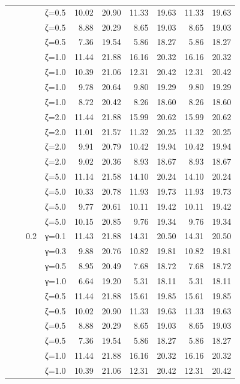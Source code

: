 \begin{table}[htbp]
\begin{tabular}{ll r l  rr  rr  rr}
  &  &  & ζ=0.5 & 10.02 & 20.90 & 11.33 & 19.63 & 11.33 & 19.63 \\
  &  &  & ζ=0.5 & 8.88 & 20.29 & 8.65 & 19.03 & 8.65 & 19.03 \\
  &  &  & ζ=0.5 & 7.36 & 19.54 & 5.86 & 18.27 & 5.86 & 18.27 \\
  &  &  & ζ=1.0 & 11.44 & 21.88 & 16.16 & 20.32 & 16.16 & 20.32 \\
  &  &  & ζ=1.0 & 10.39 & 21.06 & 12.31 & 20.42 & 12.31 & 20.42 \\
  &  &  & ζ=1.0 & 9.78 & 20.64 & 9.80 & 19.29 & 9.80 & 19.29 \\
  &  &  & ζ=1.0 & 8.72 & 20.42 & 8.26 & 18.60 & 8.26 & 18.60 \\
  &  &  & ζ=2.0 & 11.44 & 21.88 & 15.99 & 20.62 & 15.99 & 20.62 \\
  &  &  & ζ=2.0 & 11.01 & 21.57 & 11.32 & 20.25 & 11.32 & 20.25 \\
  &  &  & ζ=2.0 & 9.91 & 20.79 & 10.42 & 19.94 & 10.42 & 19.94 \\
  &  &  & ζ=2.0 & 9.02 & 20.36 & 8.93 & 18.67 & 8.93 & 18.67 \\
  &  &  & ζ=5.0 & 11.14 & 21.58 & 14.10 & 20.24 & 14.10 & 20.24 \\
  &  &  & ζ=5.0 & 10.33 & 20.78 & 11.93 & 19.73 & 11.93 & 19.73 \\
  &  &  & ζ=5.0 & 9.77 & 20.61 & 10.11 & 19.42 & 10.11 & 19.42 \\
  &  &  & ζ=5.0 & 10.15 & 20.85 & 9.76 & 19.34 & 9.76 & 19.34 \\
  &  & 0.2 & γ=0.1 & 11.43 & 21.88 & 14.31 & 20.50 & 14.31 & 20.50 \\
  &  &  & γ=0.3 & 9.88 & 20.76 & 10.82 & 19.81 & 10.82 & 19.81 \\
  &  &  & γ=0.5 & 8.95 & 20.49 & 7.68 & 18.72 & 7.68 & 18.72 \\
  &  &  & γ=1.0 & 6.64 & 19.20 & 5.31 & 18.11 & 5.31 & 18.11 \\
  &  &  & ζ=0.5 & 11.44 & 21.88 & 15.61 & 19.85 & 15.61 & 19.85 \\
  &  &  & ζ=0.5 & 10.02 & 20.90 & 11.33 & 19.63 & 11.33 & 19.63 \\
  &  &  & ζ=0.5 & 8.88 & 20.29 & 8.65 & 19.03 & 8.65 & 19.03 \\
  &  &  & ζ=0.5 & 7.36 & 19.54 & 5.86 & 18.27 & 5.86 & 18.27 \\
  &  &  & ζ=1.0 & 11.44 & 21.88 & 16.16 & 20.32 & 16.16 & 20.32 \\
  &  &  & ζ=1.0 & 10.39 & 21.06 & 12.31 & 20.42 & 12.31 & 20.42 \\

\end{tabular}
\end{table}
